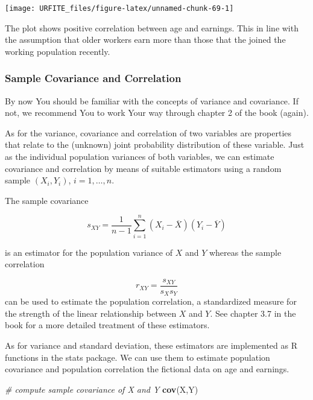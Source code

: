 \documentclass[]{book}
\newenvironment{Shaded}{\begin{snugshade}}{\end{snugshade}}
\newcommand{\KeywordTok}[1]{\textcolor[rgb]{0.13,0.29,0.53}{\textbf{#1}}}
\newcommand{\CommentTok}[1]{\textcolor[rgb]{0.56,0.35,0.01}{\textit{#1}}}
\newcommand{\NormalTok}[1]{#1}
\theoremstyle{definition}
\theoremstyle{definition}
\theoremstyle{definition}
\theoremstyle{remark}
\begin{document}
\begin{center}\texttt{[image: URFITE\_files/figure-latex/unnamed-chunk-69-1]} \end{center}

The plot shows positive correlation between age and earnings. This in
line with the assumption that older workers earn more than those that
the joined the working population recently.

\subsubsection*{Sample Covariance and
Correlation}\label{sample-covariance-and-correlation}

By now You should be familiar with the concepts of variance and
covariance. If not, we recommend You to work Your way through chapter 2
of the book (again).

As for the variance, covariance and correlation of two variables are
properties that relate to the (unknown) joint probability distribution
of these variable. Just as the individual population variances of both
variables, we can estimate covariance and correlation by means of
suitable estimators using a random sample \((X_i,Y_i)\),
\(i=1,\dots,n\).

The sample covariance

\[ s_{XY} = \frac{1}{n-1} \sum_{i=1}^n (X_i - \overline{X})(Y_i - \overline{Y}) \]

is an estimator for the population variance of \(X\) and \(Y\) whereas
the sample correlation

\[ r_{XY} = \frac{s_{XY}}{s_Xs_Y} \] can be used to estimate the
population correlation, a standardized measure for the strength of the
linear relationship between \(X\) and \(Y\). See chapter 3.7 in the book
for a more detailed treatment of these estimators.

As for variance and standard deviation, these estimators are implemented
as R functions in the stats package. We can use them to estimate
population covariance and population correlation the fictional data on
age and earnings.

\begin{Shaded}
\begin{Highlighting}[]
\CommentTok{# compute sample covariance of X and Y}
\KeywordTok{cov}\NormalTok{(X,Y)}
\end{Highlighting}
\end{Shaded}
\end{document}
